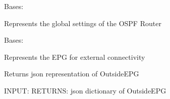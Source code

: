 \documentclass[letterpaper,10pt,english]{sphinxmanual}
\begin{document}

\begin{fulllineitems}
\label{acitoolkit:acitoolkit.OSPFRouter}
Bases: {\hyperref[acibaseobject:acibaseobject.BaseACIObject]{}}

Represents the global settings of the OSPF Router

\end{fulllineitems}


\begin{fulllineitems}
\label{acitoolkit:acitoolkit.OutsideEPG}
Bases: {\hyperref[acitoolkit:acitoolkit.CommonEPG]{}}

Represents the EPG for external connectivity

\begin{fulllineitems}
\label{acitoolkit:acitoolkit.OutsideEPG.get_json}
Returns json representation of OutsideEPG

INPUT:
RETURNS: json dictionary of OutsideEPG

\end{fulllineitems}


\end{fulllineitems}

\end{document}
